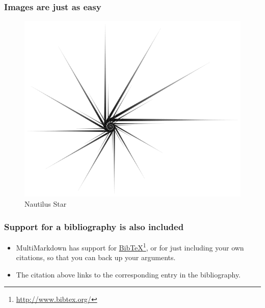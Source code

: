 \begin{frame}

\frametitle{Images are just as easy}
\label{imagesarejustaseasy}

\begin{figure}[htbp]
\centering
\includegraphics[keepaspectratio,width=\textwidth,height=0.75\textheight]{Nautilus_Star.png}
\caption{Nautilus Star}
\label{}
\end{figure}


\end{frame}

\begin{frame}

\frametitle{Support for a bibliography is also included}
\label{supportforabibliographyisalsoincluded}

\begin{itemize}
\item MultiMarkdown has support for \href{http://www.bibtex.org/}{BibTeX}\footnote{\href{http://www.bibtex.org/}{http:/\slash www.bibtex.org\slash }}, or
 for just including your own citations, so that you can back up your
 arguments.~\citep[p. 42]{fake}

\item The citation above links to the corresponding entry in the bibliography.

\end{itemize}

\end{frame}

